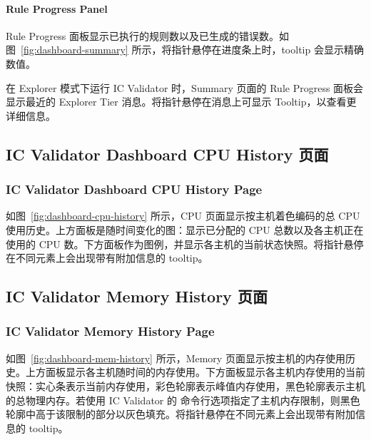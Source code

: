 \paragraph*{Rule Progress Panel}

Rule Progress 面板显示已执行的规则数以及已生成的错误数。如图~\ref{fig:dashboard-summary} 所示，将指针悬停在进度条上时，tooltip 会显示精确数值。


在 Explorer 模式下运行 IC Validator 时，Summary 页面的 Rule Progress 面板会显示最近的 Explorer Tier 消息。将指针悬停在消息上可显示 Tooltip，以查看更详细信息。

\subsection{IC Validator Dashboard CPU History 页面}
\subsubsection*{IC Validator Dashboard CPU History Page}

如图~\ref{fig:dashboard-cpu-history} 所示，CPU 页面显示按主机着色编码的总 CPU 使用历史。上方面板是随时间变化的图：显示已分配的 CPU 总数以及各主机正在使用的 CPU 数。下方面板作为图例，并显示各主机的当前状态快照。将指针悬停在不同元素上会出现带有附加信息的 tooltip。



\subsection{IC Validator Memory History 页面}
\subsubsection*{IC Validator Memory History Page}

如图~\ref{fig:dashboard-mem-history} 所示，Memory 页面显示按主机的内存使用历史。上方面板显示各主机随时间的内存使用。下方面板显示各主机内存使用的当前快照：实心条表示当前内存使用，彩色轮廓表示峰值内存使用，黑色轮廓表示主机的总物理内存。若使用 IC Validator 的  命令行选项指定了主机内存限制，则黑色轮廓中高于该限制的部分以灰色填充。将指针悬停在不同元素上会出现带有附加信息的 tooltip。

